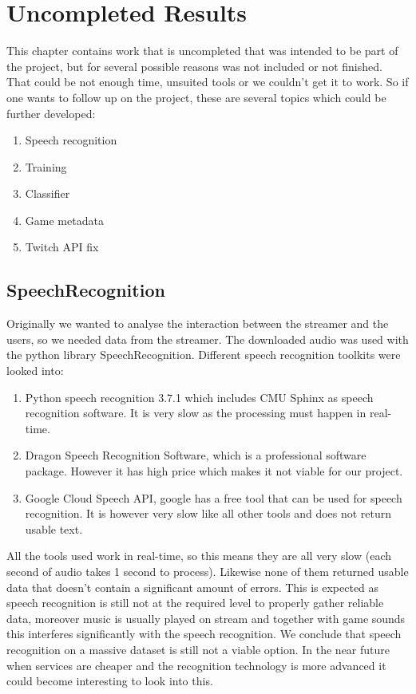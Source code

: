 \documentclass[final]{report}
\begin{document}
\chapter{Uncompleted Results}
\label{ch:Uncompleted Results}

This chapter contains work that is uncompleted that was intended to be part of the project, but for several possible reasons was not included or not finished. That could be not enough time, unsuited tools or we couldn't get it to work. So if one wants to follow up on the project, these are several topics which could be further developed:

\begin{enumerate}
	\item Speech recognition
	\item Training
	\item Classifier
	\item Game metadata
	\item Twitch API fix
\end{enumerate}

\section{SpeechRecognition}
Originally we wanted to analyse the interaction between the streamer and the users, so we needed data from the streamer.
The downloaded audio was used with the python library SpeechRecognition. %
Different speech recognition toolkits were looked into:
\begin{enumerate}
\item Python speech recognition 3.7.1 which includes CMU Sphinx as speech recognition software. It is very slow as the processing must happen in real-time.
\item Dragon Speech Recognition Software, which is a professional software package. However it has high price which makes it not viable for our project.
\item Google Cloud Speech API, google has a free tool that can be used for speech recognition. It is however very slow like all other tools and does not return usable text.
\end{enumerate}

All the tools used work in real-time, so this means they are all very slow (each second of audio takes 1 second to process). Likewise none of them returned usable data that doesn't contain a significant amount of errors.
This is expected as speech recognition is still not at the required level to properly gather reliable data, moreover music is usually played on stream and together with game sounds this interferes significantly with the speech recognition.
We conclude that speech recognition on a massive dataset is still not a viable option.
In the near future when services are cheaper and the recognition technology is more advanced it could become interesting to look into this.
\end{document}
